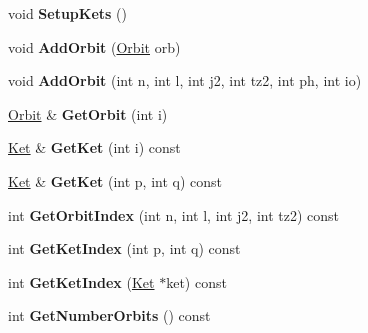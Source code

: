 \begin{DoxyCompactItemize}
\item 
\hypertarget{classModelSpace_ae1a3578ed5aabec2956998a870a4e2d2}{void {\bfseries Setup\-Kets} ()}\label{classModelSpace_ae1a3578ed5aabec2956998a870a4e2d2}

\item 
\hypertarget{classModelSpace_ad8acc2ca5b475862101595d911987a7e}{void {\bfseries Add\-Orbit} (\hyperlink{classOrbit}{Orbit} orb)}\label{classModelSpace_ad8acc2ca5b475862101595d911987a7e}

\item 
\hypertarget{classModelSpace_aad3b42327ba5e1d67569cc31f30c7070}{void {\bfseries Add\-Orbit} (int n, int l, int j2, int tz2, int ph, int io)}\label{classModelSpace_aad3b42327ba5e1d67569cc31f30c7070}

\item 
\hypertarget{classModelSpace_a9a958612b1dcf52caf0bf16539026bb4}{\hyperlink{classOrbit}{Orbit} \& {\bfseries Get\-Orbit} (int i)}\label{classModelSpace_a9a958612b1dcf52caf0bf16539026bb4}

\item 
\hypertarget{classModelSpace_adc36e64fb3bb4dc76819f91e9057844f}{\hyperlink{classKet}{Ket} \& {\bfseries Get\-Ket} (int i) const }\label{classModelSpace_adc36e64fb3bb4dc76819f91e9057844f}

\item 
\hypertarget{classModelSpace_ab3662f5e12ce6da0164c8adbe1abbb95}{\hyperlink{classKet}{Ket} \& {\bfseries Get\-Ket} (int p, int q) const }\label{classModelSpace_ab3662f5e12ce6da0164c8adbe1abbb95}

\item 
\hypertarget{classModelSpace_ab3d8cb8214e082773caa5820773ee16e}{int {\bfseries Get\-Orbit\-Index} (int n, int l, int j2, int tz2) const }\label{classModelSpace_ab3d8cb8214e082773caa5820773ee16e}

\item 
\hypertarget{classModelSpace_ad2622b2d268c55b89a2082189f7185b1}{int {\bfseries Get\-Ket\-Index} (int p, int q) const }\label{classModelSpace_ad2622b2d268c55b89a2082189f7185b1}

\item 
\hypertarget{classModelSpace_ae87e8738f2aed2f23eab933b77a3772f}{int {\bfseries Get\-Ket\-Index} (\hyperlink{classKet}{Ket} $\ast$ket) const }\label{classModelSpace_ae87e8738f2aed2f23eab933b77a3772f}

\item 
\hypertarget{classModelSpace_a48004a4a3d559081827da87c9c4bfe94}{int {\bfseries Get\-Number\-Orbits} () const }\label{classModelSpace_a48004a4a3d559081827da87c9c4bfe94}


\end{DoxyCompactItemize}
